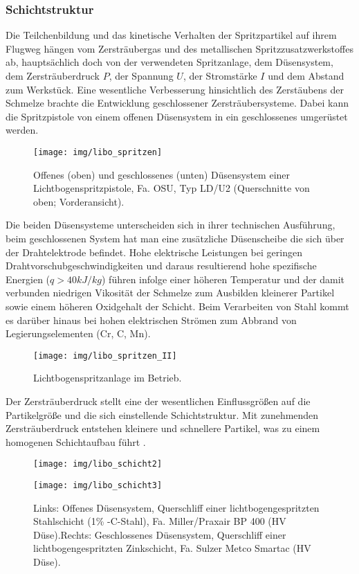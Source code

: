 \documentclass[12pt,a4paper,bibliography=totocnumbered,listof=totocnumbered,fleqn]{scrartcl}
\begin{document}
\subsubsection{Schichtstruktur}

Die Teilchenbildung und das kinetische Verhalten der Spritzpartikel auf ihrem Flugweg hängen vom Zersträubergas und des metallischen Spritzzusatzwerkstoffes ab, hauptsächlich doch von der verwendeten Spritzanlage, dem Düsensystem, dem Zersträuberdruck $P$, der Spannung $U$, der Stromstärke $I$ und dem Abstand zum Werkstück.
Eine wesentliche Verbesserung hinsichtlich des Zerstäubens der Schmelze brachte die Entwicklung geschlossener Zersträubersysteme.
Dabei kann die Spritzpistole von einem offenen Düsensystem in ein geschlossenes umgerüstet werden.

\begin{figure}[h]
\centering
\texttt{[image: img/libo\_spritzen]}
\caption{Offenes (oben) und geschlossenes (unten) Düsensystem einer Lichtbogenspritzpistole, Fa. OSU, Typ LD/U2 (Querschnitte von oben; Vorderansicht).}
\end{figure}

Die beiden Düsensysteme unterscheiden sich in ihrer technischen Ausführung, beim geschlossenen System hat man eine zusätzliche Düsenscheibe die sich über der Drahtelektrode befindet.
Hohe elektrische Leistungen bei geringen Drahtvorschubgeschwindigkeiten und daraus resultierend hohe spezifische Energien ($q > 40kJ/kg$) führen infolge einer höheren Temperatur und der damit verbunden niedrigen Vikosität der Schmelze zum Ausbilden kleinerer Partikel sowie einem höheren Oxidgehalt der Schicht.
Beim Verarbeiten von Stahl kommt es darüber hinaus bei hohen elektrischen Strömen zum Abbrand von Legierungselementen (Cr, C, Mn).

\begin{figure}[h]
\centering
\texttt{[image: img/libo\_spritzen\_II]}
\caption{Lichtbogenspritzanlage im Betrieb.}
\end{figure}

Der Zersträuberdruck stellt eine der wesentlichen Einflussgrößen auf die Partikelgröße und die sich einstellende Schichtstruktur.
Mit zunehmenden Zersträuberdruck entstehen kleinere und schnellere Partikel, was zu einem homogenen Schichtaufbau führt \citep{bobzin2013oberflchentechnik}.

\begin{figure}[h]
\begin{minipage}[t]{6cm}
\texttt{[image: img/libo\_schicht2]}
\end{minipage}
\hfill
\begin{minipage}[t]{6cm}
\texttt{[image: img/libo\_schicht3]}
\end{minipage}
\caption{Links: Offenes Düsensystem, Querschliff einer lichtbogengespritzten Stahlschicht (1\% -C-Stahl), Fa. Miller/Praxair BP 400 (HV Düse).Rechts: Geschlossenes Düsensystem, Querschliff einer lichtbogengespritzten Zinkschicht, Fa. Sulzer Metco Smartac (HV Düse).}
\end{figure}
\end{document}
